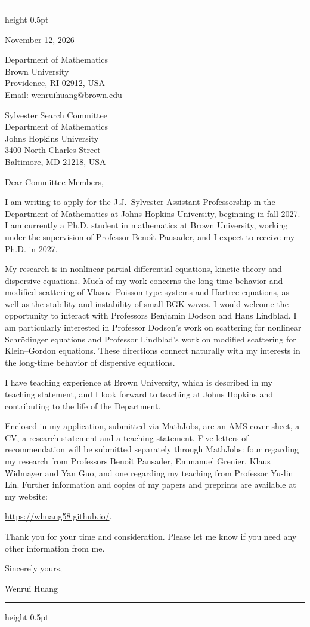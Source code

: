 \documentclass[10pt]{article}
\begin{document}
\vspace{0.08in}
\hrule height 0.5pt

\vspace{0.47in}
\hfill
\begin{minipage}{2.27in}
November 12, 2026

\vspace{0.16in}
Department of Mathematics\\
Brown University\\
Providence, RI 02912, USA\\
Email: wenrui\textunderscore huang@brown.edu
\end{minipage}

\vspace{0.30in}
Sylvester Search Committee\\
Department of Mathematics\\
Johns Hopkins University\\
3400 North Charles Street\\
Baltimore, MD 21218, USA

\vspace{0.16in}
Dear Committee Members,

I am writing to apply for the J.J.\ Sylvester Assistant Professorship in the Department of Mathematics at Johns Hopkins University, beginning in fall 2027. I am currently a Ph.D. student in mathematics at Brown University, working under the supervision of Professor Beno\^{i}t Pausader, and I expect to receive my Ph.D. in 2027.

My research is in nonlinear partial differential equations, kinetic theory and dispersive equations. Much of my work concerns the long-time behavior and modified scattering of Vlasov--Poisson-type systems and Hartree equations, as well as the stability and instability of small BGK waves. I would welcome the opportunity to interact with Professors Benjamin Dodson and Hans Lindblad. I am particularly interested in Professor Dodson's work on scattering for nonlinear Schr\"{o}dinger equations and Professor Lindblad's work on modified scattering for Klein--Gordon equations. These directions connect naturally with my interests in the long-time behavior of dispersive equations.

I have teaching experience at Brown University, which is described in my teaching statement, and I look forward to teaching at Johns Hopkins and contributing to the life of the Department.

Enclosed in my application, submitted via MathJobs, are an AMS cover sheet, a CV, a research statement and a teaching statement. Five letters of recommendation will be submitted separately through MathJobs: four regarding my research from Professors Beno\^{i}t Pausader, Emmanuel Grenier, Klaus Widmayer and Yan Guo, and one regarding my teaching from Professor Yu-lin Lin. Further information and copies of my papers and preprints are available at my website:

\url{https://whuang58.github.io/}.

\medskip
Thank you for your time and consideration. Please let me know if you need any other information from me.

\vspace{0.12in}
Sincerely yours,

\vspace{0.12in}
Wenrui Huang

\vfill
\hrule height 0.5pt
\end{document}
